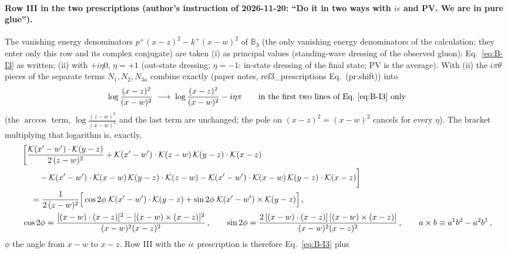 \paragraph{Row III in the two prescriptions (author's instruction of 2026-11-20: ``Do it in two ways with $i\epsilon$ and PV. We are in pure glue'').} The vanishing energy denominators $p^{+}(x-z)^{2}-k^{+}(x-w)^{2}$ of $\mathbb{B}_{3}$ (the only vanishing energy denominators of the calculation; they enter only this row and its complex conjugate) are taken (i) as principal values (standing-wave dressing of the observed gluon): Eq.~\eqref{eq:B-I3} as written; (ii) with $+i\eta0$, $\eta=+1$ (out-state dressing; $\eta=-1$: in-state dressing of the final state; PV is the average). With (ii) the $i\pi\theta$ pieces of the separate terms $N_{1},N_{2},N_{3a}$ combine exactly (paper notes, ref3\_prescriptions Eq.~(pr:shift)) into
\begin{align}
\log\frac{(x-z)^{2}}{(x-w)^{2}}\;\longrightarrow\;\log\frac{(x-z)^{2}}{(x-w)^{2}}-i\eta\pi\qquad\text{in the first two lines of Eq.~\eqref{eq:B-I3} only}\notag
\end{align}
(the $\arccos$ term, $\log\frac{(z-w)^{2}}{(x-w)^{2}}$ and the last term are unchanged; the pole on $(x-z)^{2}=(x-w)^{2}$ cancels for every $\eta$). The bracket multiplying that logarithm is, exactly,
\begin{align}
&\bigg[\frac{\mathcal{K}(x'-w')\cdot\mathcal{K}(y-z)}{2\,(z-w)^{2}}+\mathcal{K}(x'-w')\cdot\mathcal{K}(z-w)\,\mathcal{K}(y-z)\cdot\mathcal{K}(x-z)\notag\\
&\qquad-\mathcal{K}(x'-w')\cdot\mathcal{K}(x-w)\,\mathcal{K}(y-z)\cdot\mathcal{K}(z-w)-\mathcal{K}(x'-w')\cdot\mathcal{K}(x-w)\,\mathcal{K}(y-z)\cdot\mathcal{K}(x-z)\bigg]\notag\\
&\quad=\frac{1}{2\,(z-w)^{2}}\Big[\cos2\phi\;\mathcal{K}(x'-w')\cdot\mathcal{K}(y-z)+\sin2\phi\;\mathcal{K}(x'-w')\times\mathcal{K}(y-z)\Big]\,,\label{eq:B-Bij}\\
&\cos2\phi=\frac{[(x-w)\cdot(x-z)]^{2}-[(x-w)\times(x-z)]^{2}}{(x-w)^{2}(x-z)^{2}}\,,\qquad\sin2\phi=\frac{2\,[(x-w)\cdot(x-z)]\,[(x-w)\times(x-z)]}{(x-w)^{2}(x-z)^{2}}\,,\qquad a\times b\equiv a^{1}b^{2}-a^{2}b^{1}\,,\notag
\end{align}
$\phi$ the angle from $x-w$ to $x-z$. Row III with the $i\epsilon$ prescription is therefore Eq.~\eqref{eq:B-I3} plus
